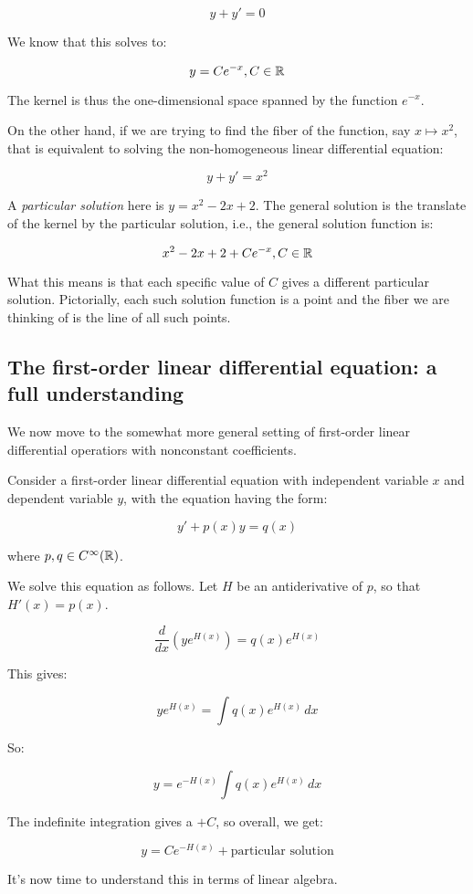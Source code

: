 \documentclass[10pt]{amsart}
\begin{document}
$$y + y' = 0$$

We know that this solves to:

$$y = Ce^{-x}, C \in \mathbb{R}$$

The kernel is thus the one-dimensional space spanned by the function
$e^{-x}$.

On the other hand, if we are trying to find the fiber of the function,
say $x \mapsto x^2$, that is equivalent to solving the non-homogeneous
linear differential equation:

$$y + y' = x^2$$

A {\em particular solution} here is $y = x^2 - 2x + 2$. The general
solution is the translate of the kernel by the particular solution,
i.e., the general solution function is:

$$x^2 - 2x + 2 + Ce^{-x}, C \in \mathbb{R}$$

What this means is that each specific value of $C$ gives a different
particular solution. Pictorially, each such solution function is a
point and the fiber we are thinking of is the line of all such points.

\subsection{The first-order linear differential equation: a full understanding}

We now move to the somewhat more general setting of first-order linear
differential operatiors with nonconstant coefficients.

Consider a first-order linear differential equation with independent
variable $x$ and dependent variable $y$, with the equation having the
form:

$$y' + p(x)y = q(x)$$

where $p,q \in C^\infty(\mathbb{R})$.

We solve this equation as follows. Let $H$ be an antiderivative of
$p$, so that $H'(x) = p(x)$. 

$$\frac{d}{dx}\left(ye^{H(x)}\right) = q(x)e^{H(x)}$$

This gives:

$$ye^{H(x)}  = \int q(x)e^{H(x)} \, dx$$

So:

$$y = e^{-H(x)}\int q(x)e^{H(x)} \, dx$$

The indefinite integration gives a $+C$, so overall, we get:

$$y = Ce^{-H(x)} + \text{particular solution}$$
  
It's now time to understand this in terms of linear algebra.
\end{document}
